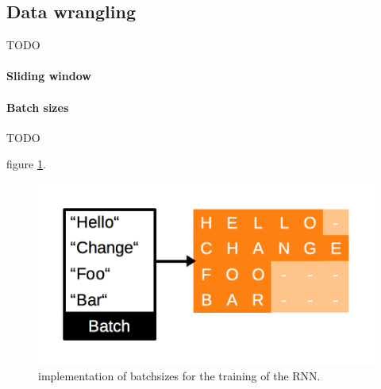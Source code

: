 \documentclass{utue} %
\begin{document}
\subsection{Data wrangling}
TODO
\paragraph{Sliding window}
\paragraph{Batch sizes}
TODO %

figure \ref{fig:impl_rnn_labels}.
\begin{figure}[h!]
	\centering
	\includegraphics[width=.9\columnwidth]{graphics/impl_rnn_labels.png}
	\caption{\label{fig:impl_rnn_labels} \footnotesize{implementation of batchsizes for the training of the RNN.}}
\end{figure}
\end{document}
